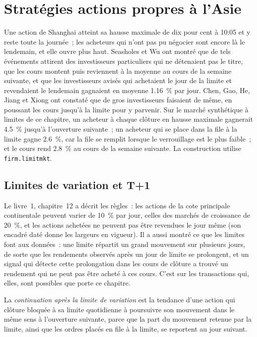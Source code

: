 \chapter{Stratégies actions propres à l'Asie}\label{ch:s1:asia-specific-equity-strategies}

Une action de Shanghai atteint sa hausse maximale de dix pour cent à 10:05 et y reste toute la journée~; les acheteurs qui n'ont pas pu négocier sont encore là le lendemain, et elle
ouvre plus haut. Seasholes et Wu ont montré que de tels événements attirent des investisseurs particuliers qui ne détenaient pas le titre, que les cours montent puis reviennent à la moyenne au cours de la
semaine suivante, et que les investisseurs avisés qui achetaient le jour de la limite et revendaient le lendemain gagnaient en moyenne 1.16~\% par jour. Chen, Gao, He, Jiang et Xiong
ont constaté que de gros investisseurs faisaient de même, en poussant les cours jusqu'à la limite pour y parvenir. Sur le marché synthétique à limites de ce chapitre, un acheteur à chaque
clôture en hausse maximale gagnerait 4.5~\% jusqu'à l'ouverture suivante~; un acheteur qui se place dans la file à la limite gagne 2.6~\%, car la file se remplit lorsque le verrouillage est le plus faible~; et
le cours rend 2.8~\% au cours de la semaine suivante. La construction utilise \texttt{firm.limitmkt}.

\section{Limites de variation et T+1}

Le livre~1, chapitre~12 a décrit les règles~: les actions de la cote principale continentale peuvent varier de 10~\% par jour, celles des marchés de croissance de 20~\%, et les actions achetées ne peuvent pas être
revendues le jour même (son encadré daté donne les largeurs en vigueur). Il a aussi montré ce que les limites font aux données~: une limite répartit un grand mouvement sur plusieurs jours, de sorte que
les rendements observés après un jour de limite se prolongent, et un signal qui détecte cette prolongation dans les cours de clôture a trouvé un rendement qui ne peut pas être acheté à
ces cours. C'est sur les transactions qui, elles, sont possibles que porte ce chapitre.

\begin{definition}\label{def:s1:asia-specific-equity-strategies:continuation}
La \emph{continuation après la limite de variation} est la tendance d'une action qui clôture bloquée à sa limite quotidienne à poursuivre son mouvement dans
le même sens à l'ouverture suivante, parce que la part du mouvement retenue par la limite, ainsi que les ordres placés en file à la limite, se reportent au
jour suivant.
\end{definition}

